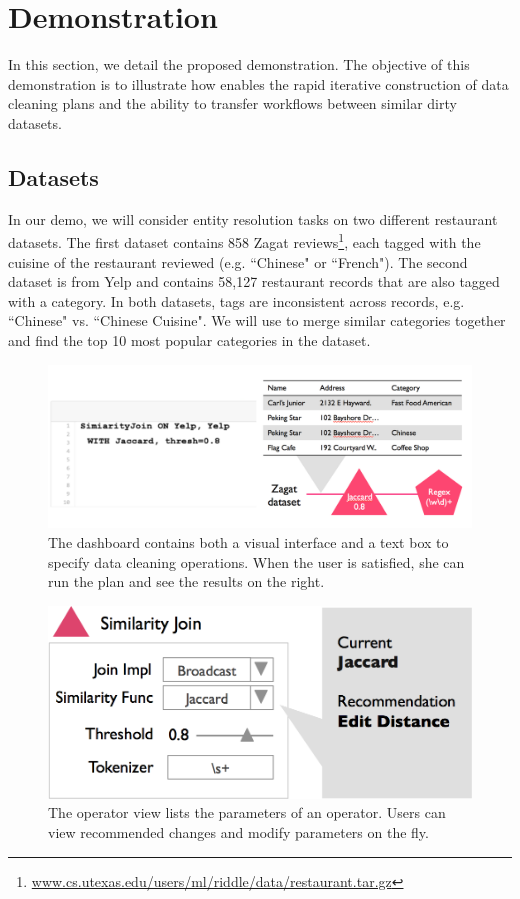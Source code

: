 \section{Demonstration}
In this section, we detail the proposed demonstration.
The objective of this demonstration is to illustrate 
how \sys enables the rapid iterative construction of data cleaning plans
and the ability to transfer workflows between similar dirty datasets.

\subsection{Datasets}
In our demo, we will consider entity resolution tasks on two different restaurant datasets.
The first dataset contains 858 Zagat reviews\footnote{\scriptsize{ \url{www.cs.utexas.edu/users/ml/riddle/data/restaurant.tar.gz}}},
each tagged with the cuisine of the restaurant reviewed (e.g. ``Chinese" or ``French").
The second dataset is from Yelp and contains 58,127 restaurant records that are also tagged with a category.
In both datasets, tags are inconsistent across records, e.g. ``Chinese" vs. ``Chinese Cuisine".
We will use \sys to merge similar categories together and find the top 10 most popular categories in the dataset.

\begin{figure}[t]
\centering
 \includegraphics[width=\columnwidth]{figs/dashboard_screenshot.png}
 \caption{The dashboard contains both a visual interface and a text box to specify data cleaning operations. When the user is satisfied, she can run the plan and see the results on the right. \label{screenshot}}
\end{figure}


\begin{figure}[t]
\centering
 \includegraphics[width=\columnwidth]{figs/dashboard_recsys.png}
 \caption{The operator view lists the parameters of an operator. Users can view recommended changes and modify parameters on the fly.}
 \label{screenshot-rec}\vspace{-1.75em}
\end{figure}

